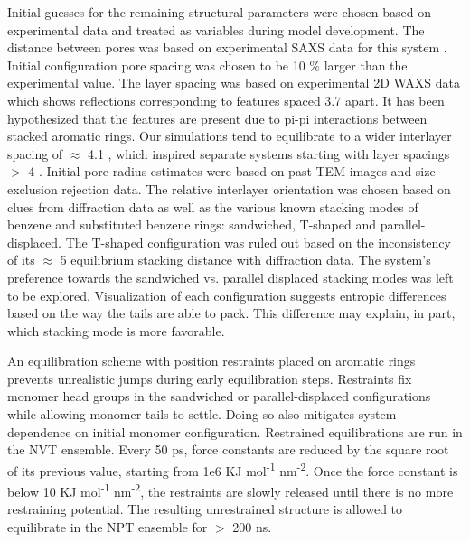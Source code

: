 
Initial guesses for the remaining structural parameters were chosen
based on experimental data and treated as variables during model
development. The distance between pores was based on experimental SAXS
data for this system \cite{feng_thin_2016}. Initial configuration pore
spacing was chosen to be 10 \% larger than the experimental value. 
The layer spacing was based on experimental 2D WAXS data which shows
reflections corresponding to features spaced 3.7 \angstrom apart. It has 
been hypothesized that the features are present due to pi-pi
interactions between stacked aromatic rings\cite{feng_scalable_2014}. 
Our simulations tend to equilibrate to a wider interlayer spacing of $\approx$ 4.1 \angstrom,
which inspired separate systems starting with layer spacings $>$ 4 \angstrom.
Initial pore radius estimates were based on past TEM 
images and size exclusion rejection data\cite{feng_scalable_2014,
feng_thin_2016,zhou_supported_2005}.
The relative interlayer orientation was chosen based on clues from diffraction
data as well as the various known stacking modes of benzene and substituted 
benzene rings: sandwiched, T-shaped and parallel-displaced. The T-shaped configuration was ruled
out based on the inconsistency of its $\approx$ 5 \angstrom equilibrium 
stacking distance with diffraction data. The system's preference
towards the sandwiched vs. parallel displaced stacking modes was left
to be explored. Visualization of each configuration suggests entropic differences 
based on the way the tails are able to pack. This difference may 
explain, in part, which stacking mode is more favorable.

An equilibration scheme with position restraints placed on aromatic rings
prevents unrealistic jumps during early equilibration steps. Restraints
fix monomer head groups in the sandwiched or parallel-displaced 
configurations while allowing monomer tails to settle. Doing so also mitigates 
system dependence on initial monomer configuration. Restrained
equilibrations are run in the NVT ensemble. Every 50 ps, force constants 
are reduced by the square root of its previous value, starting from 
1e6 KJ mol\textsuperscript{-1} nm\textsuperscript{-2}. Once the force constant
is below 10 KJ mol\textsuperscript{-1} nm\textsuperscript{-2}, the 
restraints are slowly released until there is no more restraining 
potential. The resulting unrestrained structure is allowed to 
equilibrate in the NPT ensemble for $>$ 200 ns.  %

